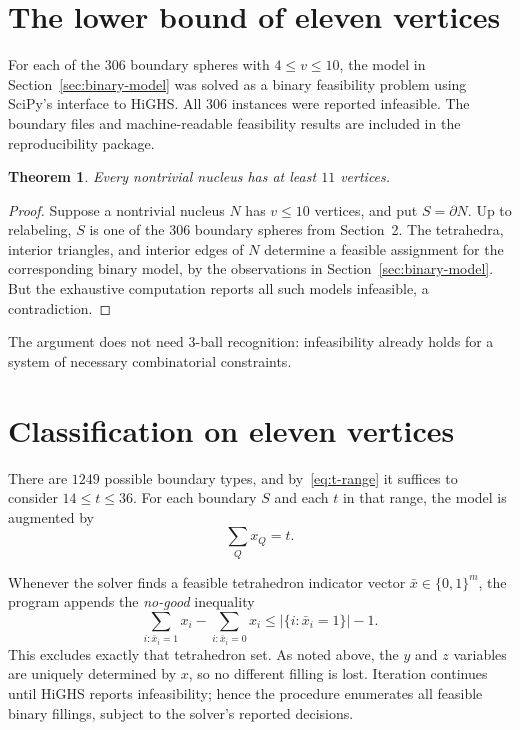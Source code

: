 \documentclass[11pt]{article}
\newtheorem{theorem}{Theorem}
\begin{document}
\section{The lower bound of eleven vertices}

For each of the $306$ boundary spheres with $4\le v\le10$, the model in
Section~\ref{sec:binary-model} was solved as a binary feasibility problem
using SciPy's interface to HiGHS.  All $306$ instances were reported
infeasible.  The boundary files and machine-readable feasibility results
are included in the reproducibility package.

\begin{theorem}\label{thm:11vertices}
Every nontrivial nucleus has at least $11$ vertices.
\end{theorem}

\begin{proof}
Suppose a nontrivial nucleus $N$ has $v\le10$ vertices, and put
$S=\partial N$.  Up to relabeling, $S$ is one of the $306$ boundary spheres
from Section~2.  The tetrahedra, interior triangles, and interior edges of
$N$ determine a feasible assignment for the corresponding binary model,
by the observations in Section~\ref{sec:binary-model}.  But the exhaustive
computation reports all such models infeasible, a contradiction.
\end{proof}

The argument does not need $3$-ball recognition: infeasibility already holds
for a system of necessary combinatorial constraints.

\section{Classification on eleven vertices}

There are $1249$ possible boundary types, and by~\eqref{eq:t-range} it
suffices to consider $14\le t\le36$.  For each boundary $S$ and each $t$
in that range, the model is augmented by
\begin{equation}\label{eq:exact-t}
 \sum_Qx_Q=t.
\end{equation}

Whenever the solver finds a feasible tetrahedron indicator vector
$\bar x\in\{0,1\}^m$, the program appends the \emph{no-good} inequality
\[
 \sum_{i:\bar x_i=1}x_i-\sum_{i:\bar x_i=0}x_i
 \le |\{i:\bar x_i=1\}|-1.
\]
This excludes exactly that tetrahedron set.  As noted above, the $y$ and
$z$ variables are uniquely determined by $x$, so no different filling is
lost.  Iteration continues until HiGHS reports infeasibility; hence the
procedure enumerates all feasible binary fillings, subject to the solver's
reported decisions.
\end{document}
